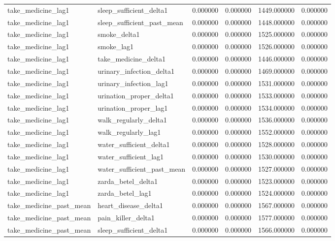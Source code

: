\begin{longtable}{llrrrr}
take\_medicine\_lag1 & sleep\_sufficient\_delta1 & 0.000000 & 0.000000 & 1449.000000 & 0.000000 \\
take\_medicine\_lag1 & sleep\_sufficient\_past\_mean & 0.000000 & 0.000000 & 1448.000000 & 0.000000 \\
take\_medicine\_lag1 & smoke\_delta1 & 0.000000 & 0.000000 & 1525.000000 & 0.000000 \\
take\_medicine\_lag1 & smoke\_lag1 & 0.000000 & 0.000000 & 1526.000000 & 0.000000 \\
take\_medicine\_lag1 & take\_medicine\_delta1 & 0.000000 & 0.000000 & 1446.000000 & 0.000000 \\
take\_medicine\_lag1 & urinary\_infection\_delta1 & 0.000000 & 0.000000 & 1469.000000 & 0.000000 \\
take\_medicine\_lag1 & urinary\_infection\_lag1 & 0.000000 & 0.000000 & 1531.000000 & 0.000000 \\
take\_medicine\_lag1 & urination\_proper\_delta1 & 0.000000 & 0.000000 & 1533.000000 & 0.000000 \\
take\_medicine\_lag1 & urination\_proper\_lag1 & 0.000000 & 0.000000 & 1534.000000 & 0.000000 \\
take\_medicine\_lag1 & walk\_regularly\_delta1 & 0.000000 & 0.000000 & 1536.000000 & 0.000000 \\
take\_medicine\_lag1 & walk\_regularly\_lag1 & 0.000000 & 0.000000 & 1552.000000 & 0.000000 \\
take\_medicine\_lag1 & water\_sufficient\_delta1 & 0.000000 & 0.000000 & 1528.000000 & 0.000000 \\
take\_medicine\_lag1 & water\_sufficient\_lag1 & 0.000000 & 0.000000 & 1530.000000 & 0.000000 \\
take\_medicine\_lag1 & water\_sufficient\_past\_mean & 0.000000 & 0.000000 & 1527.000000 & 0.000000 \\
take\_medicine\_lag1 & zarda\_betel\_delta1 & 0.000000 & 0.000000 & 1523.000000 & 0.000000 \\
take\_medicine\_lag1 & zarda\_betel\_lag1 & 0.000000 & 0.000000 & 1524.000000 & 0.000000 \\
take\_medicine\_past\_mean & heart\_disease\_delta1 & 0.000000 & 0.000000 & 1567.000000 & 0.000000 \\
take\_medicine\_past\_mean & pain\_killer\_delta1 & 0.000000 & 0.000000 & 1577.000000 & 0.000000 \\
take\_medicine\_past\_mean & sleep\_sufficient\_delta1 & 0.000000 & 0.000000 & 1566.000000 & 0.000000 \\

\end{longtable}

